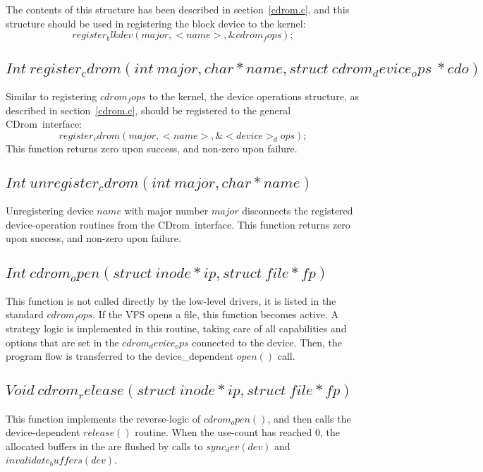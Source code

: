 \documentclass{article}
\def\cdrom{{\sc CDrom}}
\begin{document}
The contents of this structure has been described in
section~\ref{cdrom.c}, and this structure should be used in
registering the block device to the kernel:
$$
register_blkdev(major, <name>, \&cdrom_fops);
$$

\subsection{$Int\ register_cdrom(int\ major, char * name, struct\
cdrom_device_ops\ * cdo)$}

Similar to registering $cdrom_fops$ to the kernel, the device
operations structure, as described in section~\ref{cdrom.c}, should be
registered to the general \cdrom\ interface:
$$
register_cdrom(major, <name>, \&<device>_dops);
$$
This function returns zero upon success, and non-zero upon failure. 

\subsection{$Int\ unregister_cdrom(int\ major, char * name)$}

Unregistering device $name$ with major number $major$ disconnects the
registered device-operation routines from the \cdrom\ interface.
This function returns zero upon success, and non-zero upon failure. 

\subsection{$Int\ cdrom_open(struct\ inode * ip, struct\ file * fp)$}

This function is not called directly by the low-level drivers, it is
listed in the standard $cdrom_fops$. If the VFS opens a file, this
function becomes active. A strategy logic is implemented in this
routine, taking care of all capabilities and options that are set in
the $cdrom_device_ops$ connected to the device. Then, the program flow is
transferred to the device_dependent $open()$ call. 

\subsection{$Void\ cdrom_release(struct\ inode *ip, struct\ file
*fp)$}

This function implements the reverse-logic of $cdrom_open()$, and then
calls the device-dependent $release()$ routine.  When the use-count
has reached 0, the allocated buffers in the are flushed by calls to
$sync_dev(dev)$ and $invalidate_buffers(dev)$.
\end{document}

